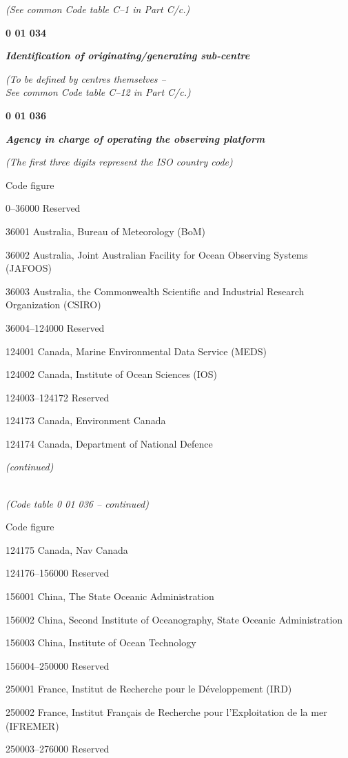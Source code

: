 \emph{(See common Code table C--1 in Part C/c.)}

\textbf{0 01 034}

\emph{\textbf{Identification of originating/generating sub-centre}}

\emph{(To be defined by centres themselves --\\
See common Code table C--12 in Part C/c.)}

\textbf{0 01 036}

\emph{\textbf{Agency in charge of operating the observing platform}}

\emph{(The first three digits represent the ISO country code)}

Code figure

0--36000 Reserved

36001 Australia, Bureau of Meteorology (BoM)

36002 Australia, Joint Australian Facility for Ocean Observing Systems (JAFOOS)

36003 Australia, the Commonwealth Scientific and Industrial Research Organization (CSIRO)

36004--124000 Reserved

124001 Canada, Marine Environmental Data Service (MEDS)

124002 Canada, Institute of Ocean Sciences (IOS)

124003--124172 Reserved

124173 Canada, Environment Canada

124174 Canada, Department of National Defence

\emph{(continued)}

\emph{\\
(Code table 0 01 036 -- continued)}

Code figure

124175 Canada, Nav Canada

124176--156000 Reserved

156001 China, The State Oceanic Administration

156002 China, Second Institute of Oceanography, State Oceanic Administration

156003 China, Institute of Ocean Technology

156004--250000 Reserved

250001 France, Institut de Recherche pour le Développement (IRD)

250002 France, Institut Français de Recherche pour l'Exploitation de la mer (IFREMER)

250003--276000 Reserved

